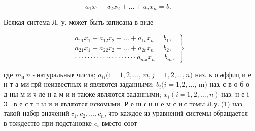 \documentclass[10pt]{article}
\begin{document}
\[

a_{1} x_{1}+a_{2} x_{2}+\ldots+a_{n} x_{n}=b .

\]



Всякая система Л. у. может быть записана в виде



\[

\left.\begin{array}{c}

a_{11} x_{1}+a_{12} x_{2}+\ldots+a_{1 n} x_{n}=b_{1}, \\

a_{21} x_{1}+a_{22} x_{2}+\ldots+a_{2 n} x_{n}=b_{2}, \\

\cdot \cdot \cdot \cdot \cdot \cdot \cdot \cdot \cdot \cdot \cdot \cdot \cdot \cdot \cdot \cdot \cdot \cdot \cdot \cdot a_{m n} x_{n}=b_{m},

\end{array}\right\}

\]



где $m_{\text {и }} n$ - натуральные числа; $a_{i j}(i=1,2, \ldots$, $m, j=1,2, \ldots, n)$ наз. к о әффиц и е н т а ми прй неизвестных и являются заданными; $b_{i}(i=1,2, \ldots$, m) наз. с в о б о д ны м и ч ле н а м и и также являются заданными; $x_{i}(i=1,2, \ldots, n)$ наз. н е і $3^{-}$ в е с т н ы и и являются искомыми. Р е ш е н и е м с и с темы Л.у. (1) наз. такой набор значений $c_{1}, c_{2}, \ldots, c_{n}$, что каждое из уравнений системы обращается в тождество при подстановке $c_{i}$ вместо соот-
\end{document}
